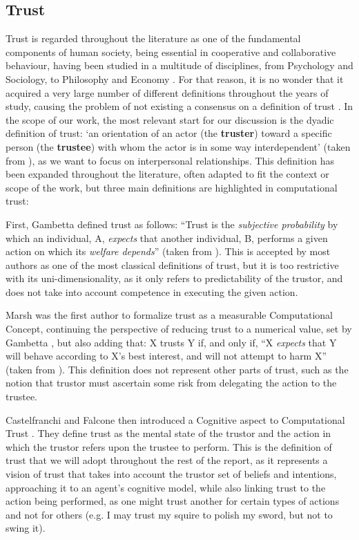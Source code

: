 \subsection{Trust}
\label{subsec:Trust}
Trust is regarded throughout the literature as one of the fundamental components of human society, being essential in cooperative and collaborative behaviour, having been studied in a multitude of disciplines, from Psychology and Sociology, to Philosophy and Economy \cite{Rousseau1998, Jones1997, Sabater2005}. For that reason, it is no wonder that it acquired a very large number of different definitions throughout the years of study, causing the problem of not existing a consensus on a definition of trust \cite{Castelfranchi2010}. In the scope of our work, the most relevant start for our discussion is the dyadic definition of trust: `an orientation of an actor (the \textbf{truster}) toward a specific person (the \textbf{trustee}) with whom the actor is in some way interdependent' (taken from \cite{Simpson2007}), as we want to focus on interpersonal relationships. This definition has been expanded throughout the literature, often adapted to fit the context or scope of the work, but three main definitions are highlighted in computational trust:
\begin{itemize}
	\tallitem First, Gambetta \cite{Gambetta1988} defined trust as follows: ``Trust is the \textit{subjective probability} by which an individual, A, \textit{expects} that another individual, B, performs a given action on which its \textit{welfare depends}'' (taken from \cite{Castelfranchi2010}). This is accepted by most authors as one of the most classical definitions of trust, but it is too restrictive with its uni-dimensionality, as it only refers to predictability of the trustor, and does not take into account competence in executing the given action.
	
	\tallitem Marsh \cite{Marsh1994} was the first author to formalize trust as a measurable Computational Concept, continuing the perspective of reducing trust to a numerical value, set by Gambetta \cite{Gambetta1988}, but also adding that: X trusts Y if, and only if, ``X \textit{expects} that Y will behave according to X's best interest, and will not attempt to harm X'' (taken from \cite{Castelfranchi2010}). This definition does not represent other parts of trust, such as the notion that trustor must ascertain some risk from delegating the action to the trustee.
	
	\tallitem Castelfranchi and Falcone then introduced a Cognitive aspect to Computational Trust \cite{Castelfranchi1998}. They define trust as the mental state of the trustor and the action in which the trustor refers upon the trustee to perform. This is the definition of trust that we will adopt throughout the rest of the report, as it represents a vision of trust that takes into account the trustor set of beliefs and intentions, approaching it to an agent's cognitive model, while also linking trust to the action being performed, as one might trust another for certain types of actions and not for others (e.g. I may trust my squire to polish my sword, but not to swing it).
\end{itemize}

